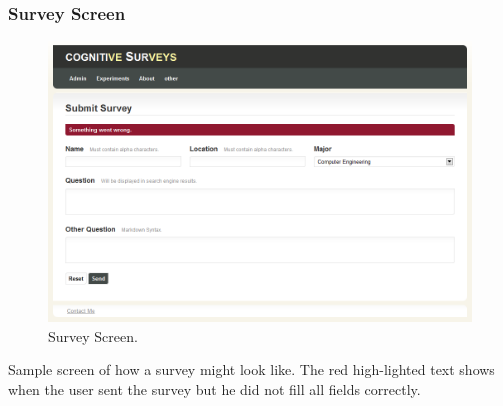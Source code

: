 \documentclass[a4paper,12pt,oneside]{report}
\begin{document}
\subsubsection{Survey Screen}
\begin{figure}[h!!]
  \begin{center}
   \includegraphics[width=14cm]{pics/survey.png}
  \end{center}
\caption{Survey Screen.}

\end{figure}
\vskip 1cm
Sample screen of how a survey might look like. The red high-lighted text shows when the user sent the survey but he did not fill all fields correctly.
\end{document}

